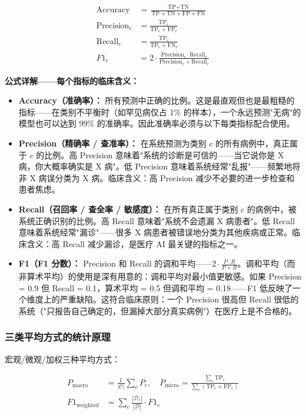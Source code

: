 \documentclass[11pt,a4paper]{ctexart}
\theoremstyle{remark}
\begin{document}
\begin{align}
\text{Accuracy} &= \frac{\text{TP} + \text{TN}}{\text{TP} + \text{TN} + \text{FP} + \text{FN}} \\
\text{Precision}_c &= \frac{\text{TP}_c}{\text{TP}_c + \text{FP}_c} \\
\text{Recall}_c &= \frac{\text{TP}_c}{\text{TP}_c + \text{FN}_c} \\
F1_c &= 2 \cdot \frac{\text{Precision}_c \cdot \text{Recall}_c}{\text{Precision}_c + \text{Recall}_c}
\end{align}

\textbf{公式详解——每个指标的临床含义：}
\begin{itemize}[nosep]
\item \textbf{Accuracy（准确率）：} 所有预测中正确的比例。这是最直观但也是最粗糙的指标——在类别不平衡时（如罕见病仅占 1\% 的样本），一个永远预测"无病"的模型也可以达到 99\% 的准确率。因此准确率必须与以下每类指标配合使用。
\item \textbf{Precision（精确率 / 查准率）：} 在系统预测为类别 $c$ 的所有病例中，真正属于 $c$ 的比例。高 Precision 意味着"系统的诊断是可信的——当它说你是 X 病，你大概率确实是 X 病"。低 Precision 意味着系统经常"乱报"——频繁地将非 X 病误分类为 X 病。临床含义：高 Precision 减少不必要的进一步检查和患者焦虑。
\item \textbf{Recall（召回率 / 查全率 / 敏感度）：} 在所有真正属于类别 $c$ 的病例中，被系统正确识别的比例。高 Recall 意味着"系统不会遗漏 X 病患者"。低 Recall 意味着系统经常"漏诊"——很多 X 病患者被错误地分类为其他疾病或正常。临床含义：高 Recall 减少漏诊，是医疗 AI 最关键的指标之一。
\item \textbf{F1（F1 分数）：} Precision 和 Recall 的调和平均——$2 \cdot \frac{P \cdot R}{P + R}$。调和平均（而非算术平均）的使用是深有用意的：调和平均对最小值更敏感。如果 Precision = 0.9 但 Recall = 0.1，算术平均 = 0.5 但调和平均 = 0.18——F1 低反映了一个维度上的严重缺陷。这符合临床原则：一个 Precision 很高但 Recall 很低的系统（"只报告自己确定的，但漏掉大部分真实病例"）在医疗上是不合格的。
\end{itemize}

\subsubsection{三类平均方式的统计原理}

宏观/微观/加权三种平均方式：

\begin{align}
P_{\text{macro}} &= \frac{1}{|\mathcal{C}|}\sum_{c} P_c, \quad
P_{\text{micro}} = \frac{\sum_c \text{TP}_c}{\sum_c (\text{TP}_c + \text{FP}_c)} \\
F1_{\text{weighted}} &= \sum_c \frac{|\mathcal{D}_c|}{|\mathcal{D}|} \cdot F1_c
\end{align}
\end{document}
